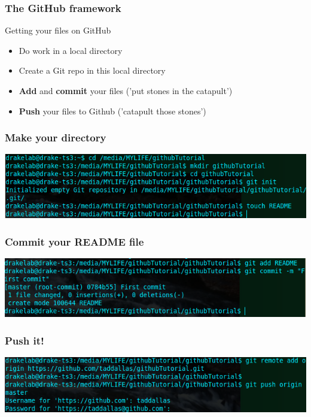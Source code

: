 \documentclass{beamer}\usepackage{graphicx, color}
\begin{document}
\begin{frame}
 \frametitle{The GitHub framework}
\begin{block}{Getting your files on GitHub}
\begin{itemize}
 \item Do work in a local directory
 \item Create a Git repo in this local directory 
 \item \textbf{Add} and \textbf{commit} your files ('put stones in the catapult')
 \item \textbf{Push} your files to Github ('catapult those stones')
\end{itemize}
\end{block}


\end{frame}


\begin{frame}
 \frametitle{\textbf{Make your directory}}
 \includegraphics[width=\textwidth]{mkdir.png}\\
\end{frame}


\begin{frame}
\frametitle{\textbf{Commit your README file}}
 \includegraphics[width=\textwidth]{add.png}\\
\end{frame}


\begin{frame}
\frametitle{\textbf{Push it!}}
 \includegraphics[width=\textwidth]{push.png}\\
\end{frame}
\end{document}
